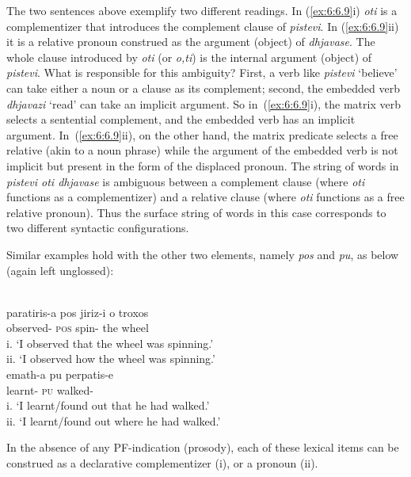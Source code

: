 \documentclass[output=paper]{langsci/langscibook}
\begin{document}
The two sentences above exemplify two different readings. In (\ref{ex:6:6.9}i) \emph{oti} is
a complementizer that introduces the complement clause of \emph{pistevi}. In
(\ref{ex:6:6.9}ii) it is a relative pronoun construed as the argument (object) of
\emph{dhjavase}. The whole clause introduced by \emph{oti} (or \emph{o,ti}) is
the internal argument (object) of \emph{pistevi}. What is responsible for this
ambiguity? First, a verb like \emph{pistevi} \enquote*{believe} can take either a noun
or a clause as its complement; second, the embedded verb \emph{dhjavazi}
\enquote*{read} can take an implicit argument. So in~(\ref{ex:6:6.9}i), the matrix verb
selects a sentential complement, and the embedded verb has an implicit
argument. In~(\ref{ex:6:6.9}ii), on the other hand, the matrix predicate selects a free
relative (akin to a noun phrase) while the argument of the embedded verb is not
implicit but present in the form of the displaced pronoun. The string of words
in \emph{pistevi oti dhjavase} is ambiguous between a complement clause (where
\emph{oti} functions as a complementizer) and a relative clause (where
\emph{oti} functions as a free relative pronoun). Thus the surface string of
words in this case corresponds to two different syntactic configurations.

Similar examples hold with the other two elements, namely \emph{pos} and
\emph{pu}, as below (again left unglossed):

\ea\label{ex:6:6.10} \\
	\gll paratiris-a  pos jiriz-i o troxos\\
		observed-\Fsg{} \textsc{pos} spin-\Tsg{} the wheel\\
	\glt i.  \enquote*{I observed that the wheel was spinning.}\\
		ii.  \enquote*{I observed how the wheel was spinning.}
\ex\label{ex:6:6.11} \\
    \gll    emath-a pu perpatis-e\\
            learnt-\Fsg{} \textsc{pu} walked-\Tsg{}  \\
	\glt    i.  \enquote*{I learnt/found out that he had walked.}\\
		    ii.  \enquote*{I learnt/found out where he had walked.}
\z

In the absence of any PF-indication (prosody), each of these lexical items can
be construed as a declarative complementizer (i), or a
pronoun (ii).
\end{document}
